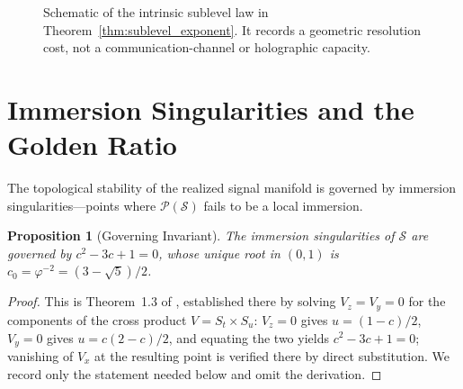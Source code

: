 \documentclass[11pt]{article}
\newtheorem{proposition}[theorem]{Proposition}
\begin{document}
\begin{figure}[htbp]
\centering
{}
\caption{Schematic of the intrinsic sublevel law in
  Theorem~\ref{thm:sublevel_exponent}.  It records a geometric resolution cost,
  not a communication-channel or holographic capacity.}
\label{fig:capacity_reduction}
\end{figure}

\section{Immersion Singularities and the Golden Ratio}
\label{sec:singularities}
The topological stability of the realized signal manifold is governed by
immersion singularities---points where $\mathcal{P}(\mathcal{S})$ fails to be
a local immersion.

\begin{proposition}[Governing Invariant]
\label{prop:singularities}
The immersion singularities of $\mathcal{S}$ are governed by
$c^2 - 3c + 1 = 0$, whose unique root in $(0,1)$ is
$c_0 = \varphi^{-2} = (3-\sqrt{5})/2$.
\end{proposition}

\begin{proof}
This is Theorem~1.3 of \cite{HayamiRuledSurface2026}, established there by
solving $V_z = V_y = 0$ for the components of the cross product
$V = S_t \times S_u$: $V_z = 0$ gives $u = (1-c)/2$, $V_y = 0$ gives
$u = c(2-c)/2$, and equating the two yields $c^2 - 3c + 1 = 0$; vanishing of
$V_x$ at the resulting point is verified there by direct substitution.  We
record only the statement needed below and omit the derivation.
\end{proof}
\end{document}
